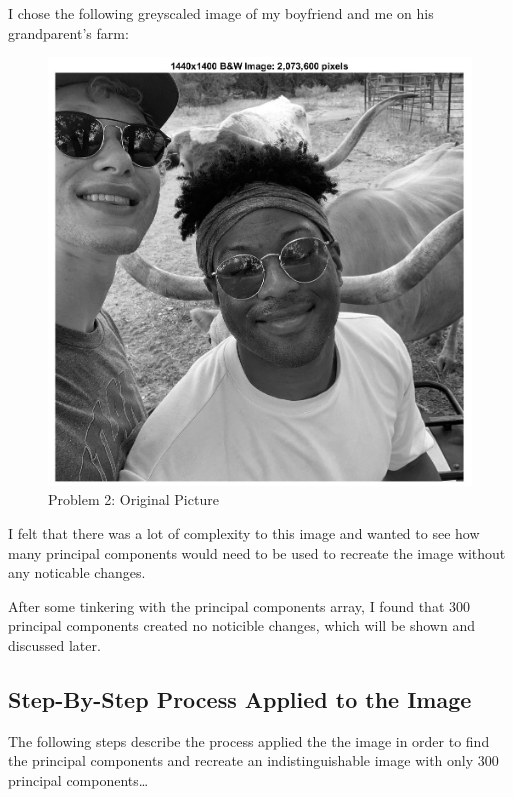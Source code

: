 \documentclass[12pt,letterpaper]{article}
\begin{document}
I chose the following greyscaled image of my boyfriend and me on his grandparent's farm:

\begin{figure}[!h]
    \centering
    \includegraphics[width = 1\textwidth]{Z_Z_BW.jpg}
    \caption{Problem 2: Original Picture}
\end{figure}

I felt that there was a lot of complexity to this image and wanted to see how many principal components would need to be used to recreate the image without any noticable changes.

After some tinkering with the principal components array, I found that 300 principal components created no noticible changes, which will be shown and discussed later.

\subsection*{Step-By-Step Process Applied to the Image}

The following steps describe the process applied the the image in order to find the principal components and recreate an indistinguishable image with only 300 principal components\ldots
\end{document}
